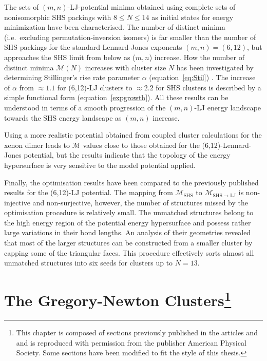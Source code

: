 The sets of $(m,n)$-\ac{LJ}-potential minima obtained using
complete sets of nonisomorphic \ac{SHS} packings with $8 \leq N \leq 14$
\autocite{Arkus_Minimalenergyclusters_2009,Arkus_DerivingFiniteSphere_2011,Hoy_Structurefinitesphere_2012,Hoy_Structuredynamicsmodel_2015,Holmes-Cerfon_EnumeratingRigidSphere_2016}
as initial states for energy minimization have been characterised. The number of
distinct minima (i.e.~excluding permutation-inversion isomers) is far smaller
than the number of \ac{SHS} packings for the standard Lennard-Jones exponents
$(m,n) = (6,12)$, but approaches the \ac{SHS} limit from below as ($m,n$)
increase. How the number of distinct minima $\mathcal{M}(N)$ increases with
cluster size $N$ has been investigated by determining Stillinger's rise rate
parameter $\alpha$ (equation~\eqref{eq:Stil})
\autocite{Stillinger_Exponentialmultiplicityinherent_1999}. The increase of
$\alpha$ from $\approx 1.1$ for (6,12)-\ac{LJ} clusters to $\approx 2.2$ for
\ac{SHS} clusters is described by a simple functional form
(equation~\eqref{expgrowth}). All these results  can be understood in terms of a
smooth progression of the $(m,n)$-\ac{LJ} energy landscape towards the \ac{SHS}
energy landscape as $(m,n)$ increase.

Using a more realistic  potential obtained from coupled cluster
calculations for the xenon dimer
\autocite{Schwerdtfeger_ExtensionLennardJonespotential_2006,Jerabek_relativisticcoupledclusterinteraction_2017}
leads to $\mathcal{M}$ values close to those obtained for the
(6,12)-Lennard-Jones potential, but the results indicate that the topology of
the energy hypersurface is very sensitive to the model potential applied.  

Finally, the optimisation results have been compared to the previously published
results for the (6,12)-\ac{LJ} potential. The mapping from
$\mathcal{M}_\text{SHS}$ to $\mathcal{M}_\mathrm{SHS\to LJ}$ is non-injective
and non-surjective, however, the number of structures missed by the optimisation
procedure is relatively small. The unmatched structures belong to the high
energy region of the potential energy hypersurface and possess rather large
variations in their bond lengths. An analysis of their geometries revealed that
most of the larger structures can be constructed from a smaller cluster by
capping some of the triangular faces. This procedure effectively sorts almost
all unmatched structures into six seeds for clusters up to $N=13$.


\chapter[The Gregory-Newton Clusters]{The Gregory-Newton Clusters\footnote{This
    chapter is composed of sections previously published in the articles
    \autocite{Trombach_stickyhardsphereLennardJonestypeclusters_2018}
    and
    \autocite{Trombach_GregoryNewtonproblemkissing_2018}
    and is reproduced with permission from the publisher 
    American Physical Society. Some sections have been modified to fit the style
    of this thesis.}}
\label{sec:thegregorynewtonclusters}

